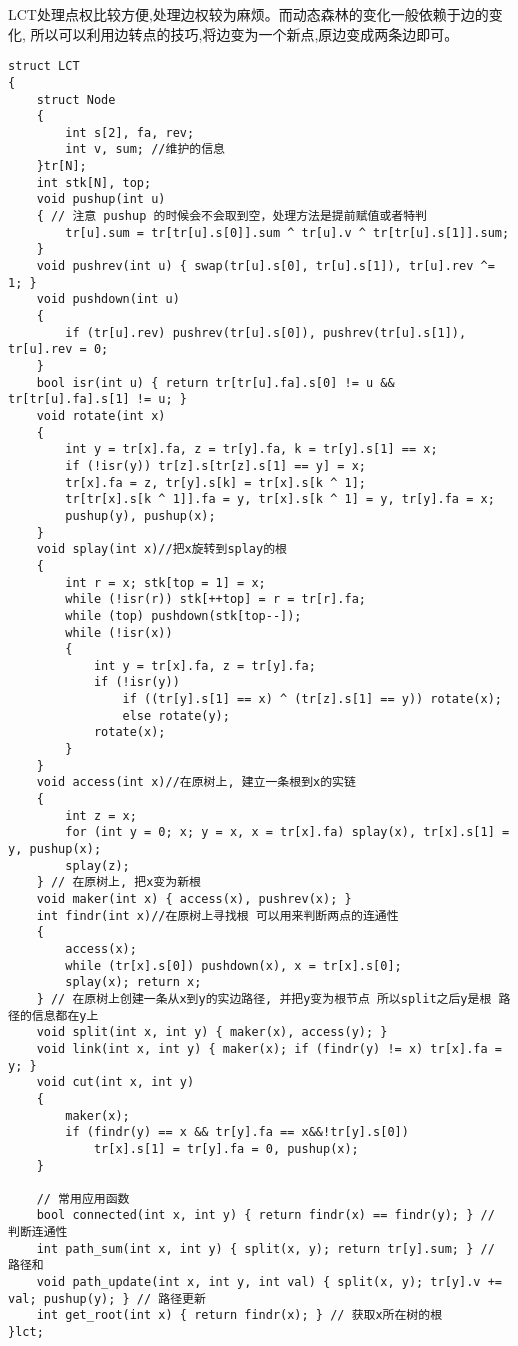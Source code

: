 \documentclass[a4paper, fontset=none]{ctexart}
\begin{document}
LCT处理点权比较方便,处理边权较为麻烦。而动态森林的变化一般依赖于边的变化,
所以可以利用边转点的技巧,将边变为一个新点,原边变成两条边即可。
\begin{verbatim}
struct LCT
{
    struct Node
    {
        int s[2], fa, rev;
        int v, sum; //维护的信息
    }tr[N];
    int stk[N], top;
    void pushup(int u)
    { // 注意 pushup 的时候会不会取到空，处理方法是提前赋值或者特判
        tr[u].sum = tr[tr[u].s[0]].sum ^ tr[u].v ^ tr[tr[u].s[1]].sum;
    }
    void pushrev(int u) { swap(tr[u].s[0], tr[u].s[1]), tr[u].rev ^= 1; }
    void pushdown(int u)
    {
        if (tr[u].rev) pushrev(tr[u].s[0]), pushrev(tr[u].s[1]), tr[u].rev = 0;
    }
    bool isr(int u) { return tr[tr[u].fa].s[0] != u && tr[tr[u].fa].s[1] != u; }
    void rotate(int x)
    {
        int y = tr[x].fa, z = tr[y].fa, k = tr[y].s[1] == x;
        if (!isr(y)) tr[z].s[tr[z].s[1] == y] = x;
        tr[x].fa = z, tr[y].s[k] = tr[x].s[k ^ 1];
        tr[tr[x].s[k ^ 1]].fa = y, tr[x].s[k ^ 1] = y, tr[y].fa = x;
        pushup(y), pushup(x);
    }
    void splay(int x)//把x旋转到splay的根
    {
        int r = x; stk[top = 1] = x;
        while (!isr(r)) stk[++top] = r = tr[r].fa;
        while (top) pushdown(stk[top--]);
        while (!isr(x))
        {
            int y = tr[x].fa, z = tr[y].fa;
            if (!isr(y))
                if ((tr[y].s[1] == x) ^ (tr[z].s[1] == y)) rotate(x);
                else rotate(y);
            rotate(x);
        }
    }
    void access(int x)//在原树上, 建立一条根到x的实链
    {
        int z = x;
        for (int y = 0; x; y = x, x = tr[x].fa) splay(x), tr[x].s[1] = y, pushup(x);
        splay(z);
    } // 在原树上, 把x变为新根
    void maker(int x) { access(x), pushrev(x); }
    int findr(int x)//在原树上寻找根 可以用来判断两点的连通性
    {
        access(x);
        while (tr[x].s[0]) pushdown(x), x = tr[x].s[0];
        splay(x); return x;
    } // 在原树上创建一条从x到y的实边路径, 并把y变为根节点 所以split之后y是根 路径的信息都在y上
    void split(int x, int y) { maker(x), access(y); }
    void link(int x, int y) { maker(x); if (findr(y) != x) tr[x].fa = y; }
    void cut(int x, int y)
    {
        maker(x);
        if (findr(y) == x && tr[y].fa == x&&!tr[y].s[0])
            tr[x].s[1] = tr[y].fa = 0, pushup(x);
    }

    // 常用应用函数
    bool connected(int x, int y) { return findr(x) == findr(y); } // 判断连通性
    int path_sum(int x, int y) { split(x, y); return tr[y].sum; } // 路径和
    void path_update(int x, int y, int val) { split(x, y); tr[y].v += val; pushup(y); } // 路径更新
    int get_root(int x) { return findr(x); } // 获取x所在树的根
}lct;

\end{verbatim}
\end{document}
